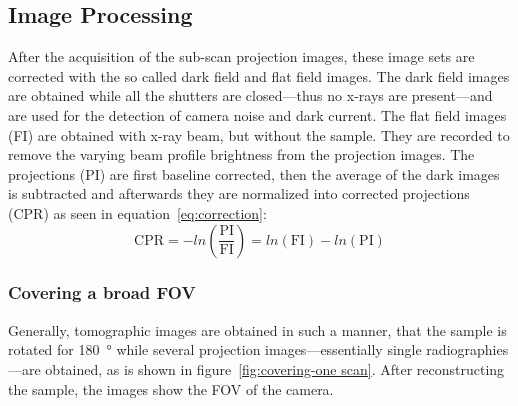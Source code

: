 \subsection{Image Processing}
\label{subsec:image processing}
After the acquisition of the sub-scan projection images, these image sets are corrected with the so called dark field and flat field images. The dark field images are obtained while all the shutters are closed---thus no x-rays are present---and are used for the detection of camera noise and dark current. The flat field images (FI) are obtained with x-ray beam, but without the sample. They are recorded to remove the varying beam profile brightness from the projection images. The projections (PI) are first baseline corrected, then the average of the dark images is subtracted and afterwards they are normalized into corrected projections (CPR) as seen in equation~\ref{eq:correction}:%
\begin{equation}
	\text{CPR}=-ln\left(\frac{\text{PI}}{\text{FI}}\right)=ln(\text{FI})-ln(\text{PI})
	\label{eq:correction}
\end{equation}

\subsubsection{Covering a broad FOV}
\label{subsec:covering a broad fov}
Generally, tomographic images are obtained in such a manner, that the sample is rotated for \SI{180}{\degree} while several projection images---essentially single radiographies---are obtained, as is shown in figure~\ref{fig:covering-one scan}. After reconstructing the sample, the images show the FOV of the camera.

\begin{figure*}[tb]
	\centering
	\subfloat[\SI{180}{\degree}]{\label{subfig:cover180}}\\
	\subfloat[\SI{360}{\degree}]{\label{subfig:cover360}}
	\caption{Covering the FOV -- one scan}
	\label{fig:covering-one scan}
\end{figure*}

\begin{figure*}[tb]
	\centering
		
	\caption{Stacked Scanning - long and thin samples}
	\label{fig:stacked-scanning}
\end{figure*}

\begin{figure*}[tb]
	\centering
		
	\caption{Stacked Scanning - broad samples}
	\label{fig:widefield-scanning}
\end{figure*}

